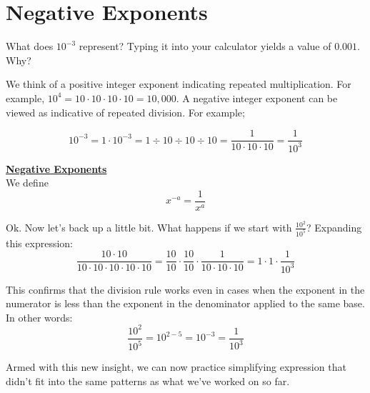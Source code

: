 %
%

\section{Negative Exponents}
\label{NegativeExponents}

What does $10^{-3}$ represent? Typing it into your calculator yields a value of $0.001$. Why?

We think of a positive integer exponent indicating repeated multiplication. For example, $10^4=10 \cdot 10 \cdot 10 \cdot 10 = 10,000$. A negative integer exponent can be viewed as indicative of repeated division. For example;

$$\displaystyle 10^{-3} = 1\cdot 10^{-3} = 1 \div 10 \div 10 \div 10 = \frac{1}{10 \cdot 10 \cdot 10}=\frac{1}{10^3}$$

%
%

\begin{definition}
	\textbf{\underline{Negative Exponents}}\\
	\bigskip
	We define $$\displaystyle x^{-a}=\frac{1}{x^a}$$
\end{definition}



Ok. Now let’s back up a little bit. What happens if we start with $\displaystyle \frac{10^2}{10^5}$?  Expanding this expression:
$$\displaystyle \frac{10 \cdot 10}{10 \cdot 10 \cdot 10 \cdot 10 \cdot 10} = \frac{10}{10} \cdot\frac{10}{10} \cdot\frac{1}{10 \cdot 10 \cdot 10} = 1 \cdot 1 \cdot \frac{1}{10^3}$$

This confirms that the division rule works even in cases when the exponent in the numerator is less than the exponent in the denominator applied to the same base.  In other words:
$$\displaystyle \frac{10^2}{10^5} = 10^{2-5} = 10^{-3} = \frac{1}{10^3}$$

Armed with this new insight, we can now practice simplifying expression that didn’t fit into the same patterns as what we’ve worked on so far. 


